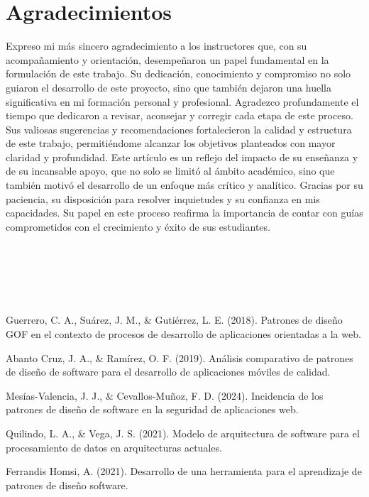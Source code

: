\documentclass[conference]{IEEEtran}
\begin{document}
\section*{Agradecimientos}
Expreso mi más sincero agradecimiento a los instructores que, con su acompañamiento y orientación, desempeñaron un papel fundamental en la formulación de este trabajo. Su dedicación, conocimiento y compromiso no solo guiaron el desarrollo de este proyecto, sino que también dejaron una huella significativa en mi formación personal y profesional.
Agradezco profundamente el tiempo que dedicaron a revisar, aconsejar y corregir cada etapa de este proceso. Sus valiosas sugerencias y recomendaciones fortalecieron la calidad y estructura de este trabajo, permitiéndome alcanzar los objetivos planteados con mayor claridad y profundidad.
Este artículo es un reflejo del impacto de su enseñanza y de su incansable apoyo, que no solo se limitó al ámbito académico, sino que también motivó el desarrollo de un enfoque más crítico y analítico. Gracias por su paciencia, su disposición para resolver inquietudes y su confianza en mis capacidades.
Su papel en este proceso reafirma la importancia de contar con guías comprometidos con el crecimiento y éxito de sus estudiantes.
\\
\\
\\
\\
\\
\\
\begin{thebibliography}{1}

 Guerrero, C. A., Su\'arez, J. M., \& Guti\'errez, L. E. (2018). Patrones de dise\~no GOF en el contexto de procesos de desarrollo de aplicaciones orientadas a la web.

 Abanto Cruz, J. A., \& Ram\'irez, O. F. (2019). An\'alisis comparativo de patrones de dise\~no de software para el desarrollo de aplicaciones m\'oviles de calidad.

 Mes\'ias-Valencia, J. J., \& Cevallos-Mu\~noz, F. D. (2024). Incidencia de los patrones de dise\~no de software en la seguridad de aplicaciones web.

 Quilindo, L. A., \& Vega, J. S. (2021). Modelo de arquitectura de software para el procesamiento de datos en arquitecturas actuales.

 Ferrandis Homsi, A. (2021). Desarrollo de una herramienta para el aprendizaje de patrones de dise\~no software.

\end{thebibliography}
\end{document}
